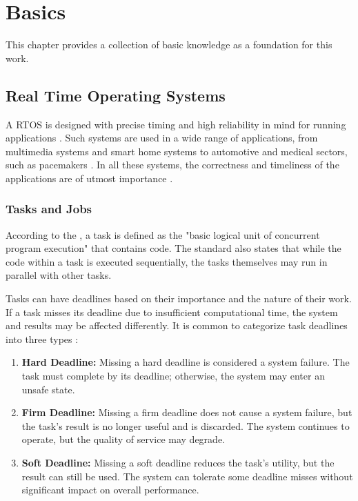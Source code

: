 \chapter{Basics}
This chapter provides a collection of basic knowledge as a foundation for this work.

\section{Real Time Operating Systems}
\label{sec:rtos}
A \ac{RTOS} is designed with precise timing and high reliability in mind for running applications \textcite{stankovicRealtimeOperatingSystems2004}.
Such systems are used in a wide range of applications, from multimedia systems and smart home systems to automotive and medical sectors, such as pacemakers \cite{hambardeSurveyRealTime2014}.
In all these systems, the correctness and timeliness of the applications are of utmost importance \cite{hambardeSurveyRealTime2014}.
\subsection{Tasks and Jobs}
\label{sec:tasks_and_jobs}
According to the , a task is defined as the "basic logical unit of concurrent program execution" that contains code. The standard also states that while the code within a task is executed sequentially, the tasks themselves may run in parallel with other tasks.

Tasks can have deadlines based on their importance and the nature of their work. If a task misses its deadline due to insufficient computational time, the system and results may be affected differently. It is common to categorize task deadlines into three types \cite{dengSchedulingRealtimeApplications1997,abeniIntegratingMultimediaApplications1998,shindeComparisonRealTime2017}:
\begin{enumerate}
	\item \textbf{Hard Deadline:}
	      Missing a hard deadline is considered a system failure. The task must complete by its deadline; otherwise, the system may enter an unsafe state.
	\item \textbf{Firm Deadline:}
	      Missing a firm deadline does not cause a system failure, but the task's result is no longer useful and is discarded. The system continues to operate, but the quality of service may degrade.
	\item \textbf{Soft Deadline:}
	      Missing a soft deadline reduces the task's utility, but the result can still be used. The system can tolerate some deadline misses without significant impact on overall performance.
\end{enumerate}

